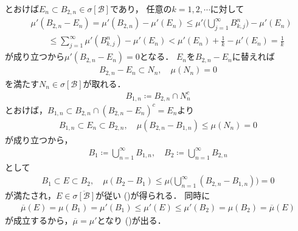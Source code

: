 \begin{prf}
\begin{description}
					とおけば$E_n \subset B_{2,n} \in \sigma[\mathcal{B}]$であり，
					任意の$k = 1,2,\cdots$に対して
					\begin{align}
						&\mu'(B_{2,n} - E_n) = \mu'(B_{2,n}) - \mu'(E_n)
						\leq \mu'\Biggl( \bigcup_{j=1}^\infty B^n_{k,j} \Biggr) - \mu'(E_n) \\
						&\qquad \leq \sum_{j=1}^\infty \mu'\left( B^n_{k,j} \right) - \mu'(E_n)
						< \mu'(E_n) + \frac{1}{k} - \mu'(E_n)
						= \frac{1}{k}
					\end{align}
					が成り立つから$\mu'(B_{2,n} - E_n) = 0$となる．
					$E_n$を$B_{2,n} - E_n$に替えれば
					\begin{align}
						B_{2,n} - E_n \subset N_n, \quad \mu(N_n) = 0
					\end{align}
					を満たす$N_n \in \sigma[\mathcal{B}]$が取れる．
					\begin{align}
						B_{1,n} \coloneqq B_{2,n} \cap N_n^c
					\end{align}
					とおけば，$B_{1,n} \subset B_{2,n} \cap (B_{2,n} - E_n)^c = E_n$より
					\begin{align}
						B_{1,n} \subset E_n \subset B_{2,n},
						\quad \mu(B_{2,n} - B_{1,n}) \leq \mu(N_n) = 0
					\end{align}
					が成り立つから，
					\begin{align}
						B_1 \coloneqq \bigcup_{n=1}^\infty B_{1,n},
						\quad B_2 \coloneqq \bigcup_{n=1}^\infty B_{2,n}
					\end{align}
					として
					\begin{align}
						B_1 \subset E \subset B_2,
						\quad \mu(B_2 - B_1) \leq \mu\Biggl( \bigcup_{n=1}^\infty(B_{2,n} - B_{1,n}) \Biggr) = 0
					\end{align}
					が満たされ，$E \in \overline{\sigma[\mathcal{B}]}$が従い
					()が得られる．
					同時に
					\begin{align}
						\overline{\mu}(E) = \mu(B_1) = \mu'(B_1)
						\leq \mu'(E) \leq \mu'(B_2) = \mu(B_2) = \overline{\mu}(E)
					\end{align}
					が成立するから，$\overline{\mu} = \mu'$となり
					()が出る．
					\QED
			\end{description}
		\end{prf}